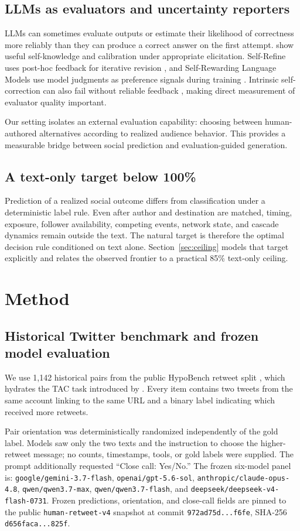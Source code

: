 \documentclass[10pt,twocolumn]{article}
\begin{document}
\subsection{LLMs as evaluators and uncertainty reporters}
LLMs can sometimes evaluate outputs or estimate their likelihood of correctness more reliably than they can produce a correct answer on the first attempt. \citet{kadavath2022} show useful self-knowledge and calibration under appropriate elicitation. Self-Refine uses post-hoc feedback for iterative revision \citep{madaan2023}, and Self-Rewarding Language Models use model judgments as preference signals during training \citep{yuan2024}. Intrinsic self-correction can also fail without reliable feedback \citep{huang2024}, making direct measurement of evaluator quality important.

Our setting isolates an external evaluation capability: choosing between human-authored alternatives according to realized audience behavior. This provides a measurable bridge between social prediction and evaluation-guided generation.

\subsection{A text-only target below 100\%}
Prediction of a realized social outcome differs from classification under a deterministic label rule. Even after author and destination are matched, timing, exposure, follower availability, competing events, network state, and cascade dynamics remain outside the text. The natural target is therefore the optimal decision rule conditioned on text alone. Section~\ref{sec:ceiling} models that target explicitly and relates the observed frontier to a practical 85\% text-only ceiling.

\section{Method}
\subsection{Historical Twitter benchmark and frozen model evaluation}
We use 1,142 historical pairs from the public HypoBench retweet split \citep{liu2025hypo}, which hydrates the TAC task introduced by \citet{tan2014}. Every item contains two tweets from the same account linking to the same URL and a binary label indicating which received more retweets.

Pair orientation was deterministically randomized independently of the gold label. Models saw only the two texts and the instruction to choose the higher-retweet message; no counts, timestamps, tools, or gold labels were supplied. The prompt additionally requested ``Close call: Yes/No.'' The frozen six-model panel is: \nolinkurl{google/gemini-3.7-flash}, \nolinkurl{openai/gpt-5.6-sol}, \nolinkurl{anthropic/claude-opus-4.8}, \nolinkurl{qwen/qwen3.7-max}, \nolinkurl{qwen/qwen3.7-flash}, and \nolinkurl{deepseek/deepseek-v4-flash-0731}. Frozen predictions, orientation, and close-call fields are pinned to the public \texttt{human-retweet-v4} snapshot at commit \texttt{972ad75d...f6fe}, SHA-256 \texttt{d656faca...825f}.
\end{document}
